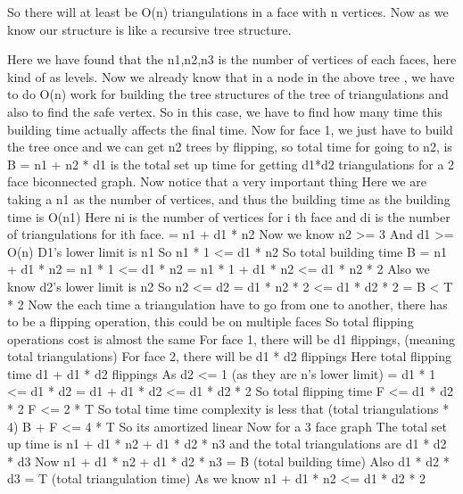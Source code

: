 \documentclass[12pt,a4paper]{article}
\begin{document}
So there will at least be O(n) triangulations in a face with n vertices.
Now as we know our structure is like a recursive tree structure.

Here we have found that the n1,n2,n3 is the number of vertices of each faces, here kind of as levels. Now we already know that in a node in the above tree , we have to do O(n) work for building the tree structures of the tree of triangulations and also to find the safe vertex. So in this case, we have to find  how many time this building time actually affects the final time. 
Now for face 1, we just have to build the tree once and we can get n2 trees by flipping, so total time for going to n2, is 
B = n1 + n2 * d1 is the total set up time for getting d1*d2 triangulations for a 2 face biconnected graph.
Now notice that a very important thing 
Here we are taking a n1 as the number of vertices, and thus the building time as the building time is O(n1) 
Here ni is the number of vertices for i th face and di is the number of triangulations for ith face.
= n1 + d1 * n2
Now we know n2 >= 3
And d1 >= O(n)
D1’s lower limit is n1
So n1 * 1 <= d1 * n2
So total building time B = n1 + d1 * n2 
= n1 * 1 <= d1 * n2
= n1 * 1 + d1 * n2 <= d1 * n2 * 2
Also we know d2’s lower limit is n2
So n2 <= d2
= d1 * n2 * 2 <= d1 * d2 * 2
= B < T * 2
Now the each time a triangulation have to go from one to another, there has to be a flipping operation, this could be on multiple faces
So total flipping operations cost is almost the same
For face 1, there will be d1 flippings, (meaning total triangulations)
For face 2, there will be d1 * d2 flippings 
Here total flipping time d1 + d1 * d2 flippings
As d2 <= 1 (as they are n’s lower limit)
= d1 * 1 <= d1 * d2
= d1 + d1 * d2 <= d1 * d2 * 2
So total flipping time F <= d1 * d2 * 2
F <= 2 * T
So total time time complexity is less that (total triangulations * 4)
B + F <= 4 * T
So its amortized linear
Now for a 3 face graph
The total set up time is n1 + d1 * n2 + d1 * d2 * n3 and the total triangulations are d1 * d2 * d3
Now n1 + d1 * n2 + d1 * d2 * n3 = B (total building time)
Also d1 * d2 * d3 = T (total triangulation time)
As we know n1 + d1 * n2 <= d1 * d2 * 2
\end{document}
